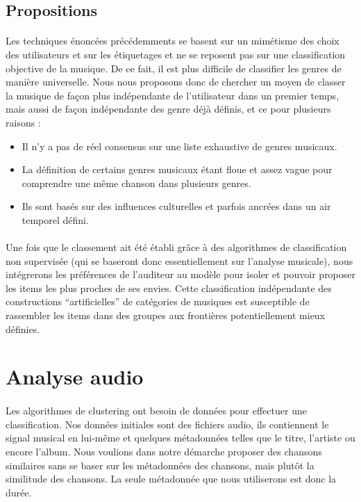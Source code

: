 \documentclass[soumission]{ir}
\begin{document}
\subsection{Propositions}
\paragraph{}
Les techniques énoncées précédemments se basent sur un mimétisme des choix des utilisateurs et sur les 
étiquetages et ne se reposent pas sur une classification objective de la musique. De ce fait, il est plus 
difficile de classifier les genres de manière universelle. Nous nous proposons donc de chercher un moyen de 
classer la musique de façon plus indépendante de l’utilisateur dans un premier temps, mais aussi de façon 
indépendante des genre déjà définis, et ce pour plusieurs raisons :
\begin{itemize}
    \item {Il n’y a pas de réel consensus sur une liste exhaustive de genres musicaux.}
    \item {La définition de certains genres musicaux étant floue et assez vague pour comprendre une même 
    chanson dans plusieurs genres.}
    \item {Ils sont basés sur des influences culturelles et parfois ancrées dans un air temporel défini.}
\end{itemize}

\paragraph{}
Une fois que le classement ait été établi grâce à des algorithmes de classification non supervisée (qui se 
baseront donc essentiellement sur l’analyse musicale), nous intégrerons les préférences de l’auditeur au 
modèle pour isoler et pouvoir proposer les items les plus proches de ses envies. Cette classification 
indépendante des constructions “artificielles” de catégories de musiques est susceptible de rassembler les 
items dans des groupes aux frontières potentiellement mieux définies.

\section{Analyse audio}
\paragraph{}
Les algorithmes de clustering ont besoin de données pour effectuer une classification. Nos données initiales 
sont des fichiers audio, ils contiennent le signal musical en lui-même et quelques métadonnées telles que le 
titre, l’artiste ou encore l'album. Nous voulions dans notre démarche proposer des chansons similaires sans 
se baser sur les métadonnées des chansons, mais plutôt la similitude des chansons. La seule métadonnée que 
nous utiliserons est donc la durée.
\end{document}
